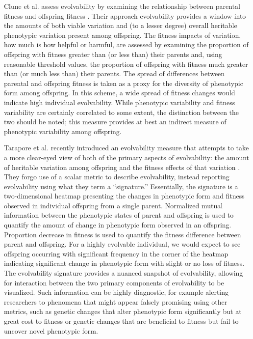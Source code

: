 Clune et al. assess evolvability by examining the relationship between parental fitness and offspring fitness \cite{Clune2011OnRegularity}. Their approach evolvability provides a window into the amounts of both viable variation and (to a lesser degree) overall heritable phenotypic variation present among offspring. The fitness impacts of variation, how much is how helpful or harmful, are assessed by examining the proportion of offspring with fitness greater than (or less than) their parents and, using reasonable threshold values, the proportion of offspring with fitness much greater than (or much less than) their parents. The spread of differences between parental and offspring fitness is taken as a proxy for the diversity of phenotypic form among offspring. In this scheme, a wide spread of fitness changes would indicate high individual evolvability. While phenotypic variability and fitness variability are certainly correlated to some extent, the distinction between the two should be noted; this measure provides at best an indirect measure of phenotypic variability among offspring.

Tarapore et al. recently introduced an evolvability measure that attempts to take a more clear-eyed view of both of the primary aspects of evolvability: the amount of heritable variation among offspring and the fitness effects of that variation \cite{Tarapore2015EvolvabilityBenchmarks}. They forgo use of a scalar metric to describe evolvability, instead reporting evolvability using what they term a ``signature.'' Essentially, the signature is a two-dimensional heatmap presenting the changes in phenotypic form and fitness observed in individual offspring from a single parent. Normalized mutual information between the phenotypic states of parent and offspring is used to quantify the amount of change in phenotypic form observed in an offspring. Proportion decrease in fitness is used to quantify the fitness difference between parent and offspring. For a highly evolvable individual, we would expect to see offspring occurring with significant frequency in the corner of the heatmap indicating significant change in phenotypic form with slight or no loss of fitness. The evolvability signature provides a nuanced snapshot of evolvability, allowing for interaction between the two primary components of evolvability to be visualized. Such information can be highly diagnostic, for example alerting researchers to phenomena that might appear falsely promising using other metrics, such as genetic changes that alter phenotypic form significantly but at great cost to fitness or genetic changes that are beneficial to fitness but fail to uncover novel phenotypic form.

